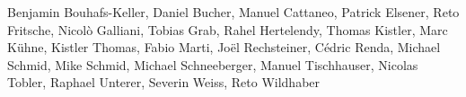 %
%
%
Benjamin Bouhafs-Keller,	%
Daniel Bucher, 			%
Manuel Cattaneo,		%
Patrick Elsener,		%
Reto Fritsche,			%
Nicolò Galliani,		%
Tobias Grab,			%
Rahel Hertelendy,		%
Thomas Kistler,			%
Marc Kühne,			%
Kistler Thomas,			%
Fabio Marti,			%
Joël Rechsteiner,		%
Cédric Renda,			%
Michael Schmid,			%
Mike Schmid,			%
Michael Schneeberger,		%
Manuel Tischhauser,		%
Nicolas Tobler,			%
Raphael Unterer,		%
Severin Weiss,			%
Reto Wildhaber			%
